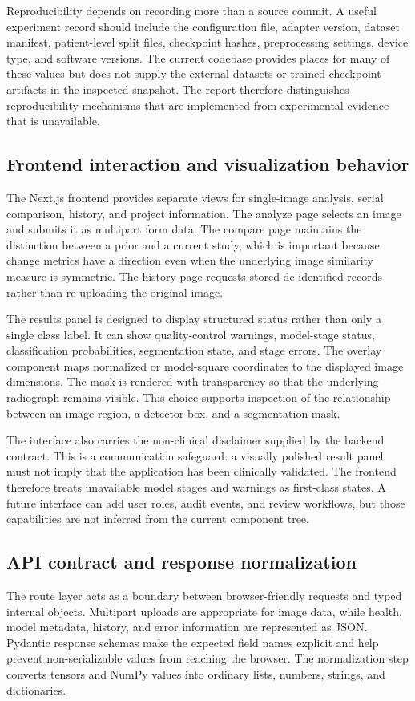 \documentclass[12pt,a4paper]{article}
\begin{document}
Reproducibility depends on recording more than a source commit. A useful experiment record should include the configuration file, adapter version, dataset manifest, patient-level split files, checkpoint hashes, preprocessing settings, device type, and software versions. The current codebase provides places for many of these values but does not supply the external datasets or trained checkpoint artifacts in the inspected snapshot. The report therefore distinguishes reproducibility mechanisms that are implemented from experimental evidence that is unavailable.

\subsection{Frontend interaction and visualization behavior}
The Next.js frontend provides separate views for single-image analysis, serial comparison, history, and project information. The analyze page selects an image and submits it as multipart form data. The compare page maintains the distinction between a prior and a current study, which is important because change metrics have a direction even when the underlying image similarity measure is symmetric. The history page requests stored de-identified records rather than re-uploading the original image.

The results panel is designed to display structured status rather than only a single class label. It can show quality-control warnings, model-stage status, classification probabilities, segmentation state, and stage errors. The overlay component maps normalized or model-square coordinates to the displayed image dimensions. The mask is rendered with transparency so that the underlying radiograph remains visible. This choice supports inspection of the relationship between an image region, a detector box, and a segmentation mask.

The interface also carries the non-clinical disclaimer supplied by the backend contract. This is a communication safeguard: a visually polished result panel must not imply that the application has been clinically validated. The frontend therefore treats unavailable model stages and warnings as first-class states. A future interface can add user roles, audit events, and review workflows, but those capabilities are not inferred from the current component tree.

\subsection{API contract and response normalization}
The route layer acts as a boundary between browser-friendly requests and typed internal objects. Multipart uploads are appropriate for image data, while health, model metadata, history, and error information are represented as JSON. Pydantic response schemas make the expected field names explicit and help prevent non-serializable values from reaching the browser. The normalization step converts tensors and NumPy values into ordinary lists, numbers, strings, and dictionaries.
\end{document}
